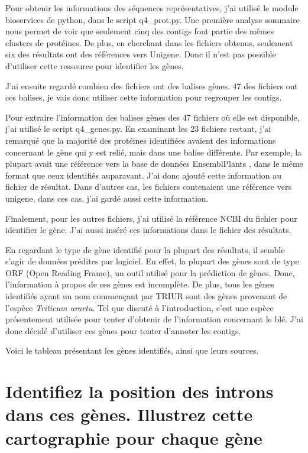 \documentclass[10.9pt]{article} %
\begin{document}
Pour obtenir les informations des séquences représentatives, j'ai utilisé le module bioservices
de python, dans le script q4\_prot.py. Une première analyse sommaire nous permet de voir que
seulement cinq des contigs font partie des mêmes clusters de protéines. De plus, en cherchant dans
les fichiers obtenus, seulement six des résultats ont des références vers Unigene. Donc il n'est
pas possible d'utiliser cette ressource pour identifier les gènes.

J'ai ensuite regardé combien des fichiers ont des balises gènes. 47 des fichiers ont ces balises, je
vais donc utiliser cette information pour regrouper les contigs.

Pour extraire l'information des balises gènes des 47 fichiers où elle est disponible, j'ai utilisé le
script q4\_genes.py. En examinant les 23 fichiers restant, j'ai remarqué que la majorité des protéines
identifiées avaient des informations concernant le gène qui y est relié, mais dans une balise différente.
Par exemple, la plupart avait une référence vers la base de données EnsemblPlants \cite{ENSEMBL}, dans le même format
que ceux identifiés auparavant. J'ai donc ajouté cette information au fichier de résultat. Dans d'autres
cas, les fichiers contenaient une référence vers unigene, dans ces cas, j'ai gardé aussi cette information.

Finalement, pour les autres fichiers, j'ai utilisé la référence NCBI du fichier pour identifier le gène. J'ai aussi
inséré ces informations dans le fichier des résultats.

En regardant le type de gène identifié pour la plupart des résultats, il semble s'agir de données prédites par logiciel.
En effet, la plupart des gènes sont de type ORF (Open Reading Frame), un outil utilisé pour la prédiction de gènes.
Donc, l'information à propos de ces gènes est incomplète. De plus, tous les gènes identifiés ayant un nom commençant
par TRIUR sont des gènes provenant de l'espèce \emph{Triticum urartu}. Tel que discuté à l'introduction, c'est une
espèce présentement utilisée pour tenter d'obtenir de l'information concernant le blé. J'ai donc décidé d'utiliser ces
gènes pour tenter d'annoter les contigs.

Voici le tableau présentant les gènes identifiés, ainsi que leurs sources.



\section{Identifiez la position des introns dans ces gènes. Illustrez cette cartographie pour chaque gène}
\end{document}
